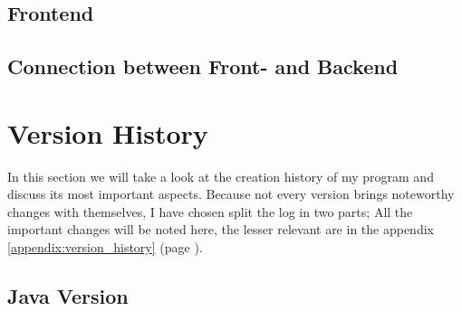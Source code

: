\documentclass[10pt,a4paper,titlepage]{article}
\begin{document}
	\subsection{Frontend}
	\subsection{Connection between Front- and Backend}
	
	\section{Version History}
	In this section we will take a look at the creation history of my program and discuss its most important aspects. Because not every version brings noteworthy changes with themselves, I have chosen split the log in two parts; All the important changes will be noted here, the lesser relevant are in the appendix \ref{appendix:version_history} (page \pageref{appendix:version_history}).
	\subsection{Java Version}
\end{document}
